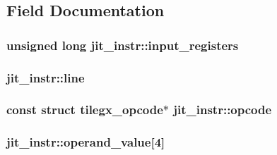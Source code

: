\subsection{Field Documentation}
\subsubsection[{\texorpdfstring{input\+\_\+registers}{input_registers}}]{\setlength{\rightskip}{0pt plus 5cm}unsigned long jit\+\_\+instr\+::input\+\_\+registers}\hypertarget{structjit__instr_a60ebcc2074315cc90961dc05deae1c13}{}\label{structjit__instr_a60ebcc2074315cc90961dc05deae1c13}
\subsubsection[{\texorpdfstring{line}{line}}]{ jit\+\_\+instr\+::line}\hypertarget{structjit__instr_a48ebae1e2eb215baf3d241a1ec45de2d}{}\label{structjit__instr_a48ebae1e2eb215baf3d241a1ec45de2d}
\subsubsection[{\texorpdfstring{opcode}{opcode}}]{\setlength{\rightskip}{0pt plus 5cm}const struct {\bf tilegx\+\_\+opcode}$\ast$ jit\+\_\+instr\+::opcode}\hypertarget{structjit__instr_a8047087b3d887939621965b80a95efd4}{}\label{structjit__instr_a8047087b3d887939621965b80a95efd4}
\subsubsection[{\texorpdfstring{operand\+\_\+value}{operand_value}}]{ jit\+\_\+instr\+::operand\+\_\+value\mbox{[}4\mbox{]}}\hypertarget{structjit__instr_a6679f200dfd43f97b98ebcb1d05ccbdf}{}\label{structjit__instr_a6679f200dfd43f97b98ebcb1d05ccbdf}
